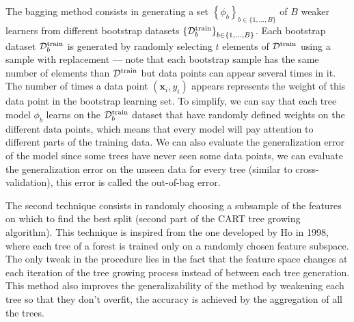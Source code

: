 \documentclass[main]{subfiles}
\begin{document}
The bagging method consists in generating a set ${\left\{\phi_b\right\}}_{b\in \{1,\ldots,B\}}$ of $B$ weaker learners from different bootstrap datasets ${\left\{\mathcal{D}^{\text{train}}_b\right\}}_{b\in \{1,\ldots,B\}}$. Each bootstrap dataset $\mathcal{D}^{\text{train}}_b$ is generated by randomly selecting $t$ elements of $\mathcal{D}^{\text{train}}$ using a sample with replacement --- note that each bootstrap sample has the same number of elements than $\mathcal{D}^{\text{train}}$ but data points can appear several times in it. The number of times a data point $(\mathbf{x}_i,y_i)$ appears represents the weight of this data point in the bootstrap learning set. To simplify, we can say that each tree model $\phi_b$ learns on the $\mathcal{D}^{\text{train}}_b$ dataset that have randomly defined weights on the different data points, which means that every model will pay attention to different parts of the training data. We can also evaluate the generalization error of the model since some trees have never seen some data points, we can evaluate the generalization error on the unseen data for every tree (similar to cross-validation), this error is called the out-of-bag error.

The second technique consists in randomly choosing a subsample of the features on which to find the best split (second part of the CART tree growing algorithm). This technique is inspired from the one developed by Ho in 1998, where each tree of a forest is trained only on a randomly chosen feature subspace.\autocite{Tin_Kam_Ho_1998} The only tweak in the procedure lies in the fact that the feature space changes at each iteration of the tree growing process instead of between each tree generation. This method also improves the generalizability of the method by weakening each tree so that they don't overfit, the accuracy is achieved by the aggregation of all the trees. 
\end{document}
